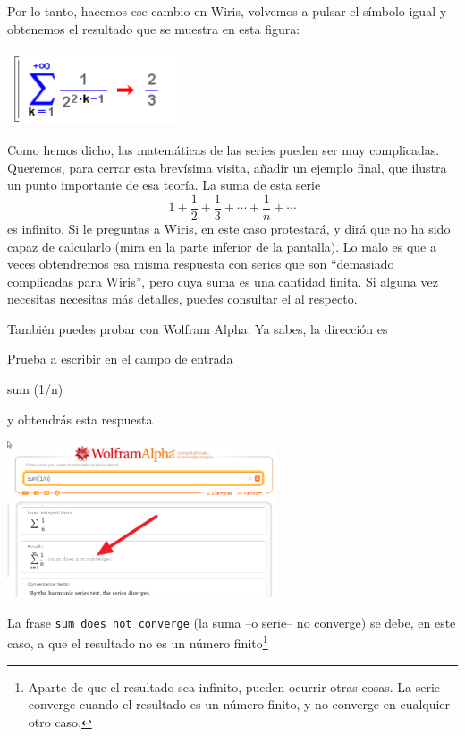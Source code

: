 \documentclass[10pt,a4paper]{article}\usepackage[]{graphicx}\usepackage[]{color}
\begin{document}
Por lo tanto, hacemos ese cambio en Wiris, volvemos a pulsar el símbolo igual y obtenemos el resultado que se muestra en esta figura:
    \begin{center}
    \includegraphics[width=5cm]{../fig/Tut05-05.png}
    \end{center}

Como hemos dicho, las matemáticas de las series pueden ser muy complicadas. Queremos, para cerrar esta brevísima visita, añadir un ejemplo final, que ilustra un punto importante de esa teoría. La suma de esta serie
\[1+\dfrac{1}{2}+\dfrac{1}{3}+\cdots+\dfrac{1}{n}+\cdots\]
es infinito. Si le preguntas a Wiris, en este caso protestará, y dirá que no ha sido capaz de calcularlo (mira en la parte inferior de la pantalla). Lo malo es que a veces obtendremos esa misma respuesta con series que son ``demasiado complicadas para Wiris'', pero cuya suma es una cantidad finita. Si alguna vez necesitas necesitas más detalles, puedes consultar el
 al respecto.

También  puedes probar con Wolfram Alpha. Ya sabes, la dirección es

\begin{center}
\end{center}

Prueba a escribir en el campo de entrada
\begin{center}
\begin{minipage}{12cm}
    sum (1/n)
\end{minipage}
\end{center}

y obtendrás esta respuesta
    \begin{center}
    \includegraphics[width=8cm]{../fig/Tut05-06.png}
    \end{center}
La frase {\tt sum does not converge} (la suma --o serie-- no converge) se debe, en este caso, a que el resultado no es un número finito\footnote{Aparte de que el resultado sea infinito,  pueden ocurrir otras cosas. La serie converge cuando el resultado es un número finito, y no converge en cualquier otro caso.}
\end{document}
